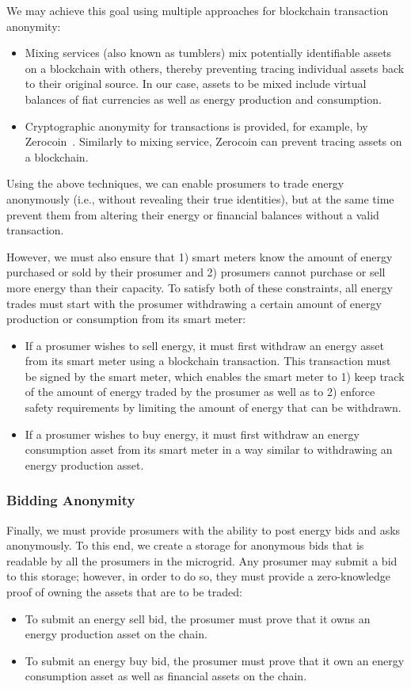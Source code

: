 We may achieve this goal using multiple approaches for blockchain transaction anonymity:
\begin{itemize}
\item Mixing services (also known as tumblers) mix potentially identifiable assets on a blockchain with others, thereby preventing tracing individual assets back to their original source. 
In our case, assets to be mixed include virtual balances of fiat currencies as well as energy production and consumption.
\item Cryptographic anonymity for transactions is provided, for example, by Zerocoin~\cite{miers2013zerocoin}. Similarly to mixing service, Zerocoin can prevent tracing assets on a blockchain.
\end{itemize}
Using the above techniques, we can enable prosumers to trade energy anonymously (i.e., without revealing their true identities), but at the same time prevent them from altering their energy or financial balances without a valid transaction.

However, we must also ensure that 1) smart meters know the amount of energy purchased or sold by their prosumer and 2) prosumers cannot purchase or sell more energy than their capacity.
To satisfy both of these constraints, all energy trades must start with the prosumer withdrawing a certain amount of energy production or consumption from its smart meter:
\begin{itemize}
\item If a prosumer wishes to sell energy, it must first withdraw an energy asset from its smart meter using a blockchain transaction.
This transaction must be signed by the smart meter, which enables the smart meter to 1) keep track of the amount of energy traded by the prosumer as well as to 2) enforce safety requirements by limiting the amount of energy that can be withdrawn.
\item If a prosumer wishes to buy energy, it must first withdraw an energy consumption asset from its smart meter in a way similar to withdrawing an energy production asset.
\end{itemize}

\subsubsection{Bidding Anonymity}
Finally, we must provide prosumers with the ability to post energy bids and asks anonymously.
To this end, we create a storage for anonymous bids that is readable by all the prosumers in the microgrid.
Any prosumer may submit a bid to this storage; however, in order to do so, they must provide a zero-knowledge proof of owning the assets that are to be traded:
\begin{itemize}
\item To submit an energy sell bid, the prosumer must prove that it owns an energy production asset on the chain.
\item To submit an energy buy bid, the prosumer must prove that it own an energy consumption asset as well as financial assets on the chain.
\end{itemize}


